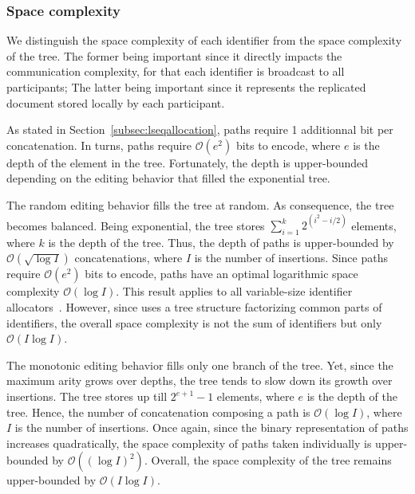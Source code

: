 
\subsubsection{Space complexity}

We distinguish the space complexity of each identifier from the space complexity
of the tree. The former being important since it directly impacts the
communication complexity, for that each identifier is broadcast to all
participants; The latter being important since it represents the replicated
document stored locally by each participant.

As stated in Section~\ref{subsec:lseqallocation}, paths require 1 additionnal
bit per concatenation. In turns, paths require $\mathcal{O}(e^2)$ bits to
encode, where $e$ is the depth of the element in the tree. Fortunately, the
depth is upper-bounded depending on the editing behavior that filled the
exponential tree.

The random editing behavior fills the tree at random. As consequence, the tree
becomes balanced. Being exponential, the tree stores
$\textstyle\sum\nolimits_{i=1}^{k}{2^{(i^2-i/2)}}$ elements, where $k$ is the
depth of the tree. Thus, the depth of paths is upper-bounded by
$\mathcal{O}(\sqrt{\log I})$ concatenations, where $I$ is the number of
insertions. Since paths require $\mathcal{O}(e^2)$ bits to encode, paths have an
optimal logarithmic space complexity $\mathcal{O}(\log I)$. This result applies
to all variable-size identifier allocators~\cite{preguica2009commutative,
  weiss2009logoot}. However, since \LSEQ uses a tree structure factorizing
common parts of identifiers, the overall space complexity is not the sum of
identifiers but only $\mathcal{O}(I\log I)$.

The monotonic editing behavior fills only one branch of the tree. Yet, since the
maximum arity grows over depths, the tree tends to slow down its growth over
insertions. The tree stores up till $2^{e+1}-1$ elements, where $e$ is the depth
of the tree. Hence, the number of concatenation composing a path is
$\mathcal{O}(\log I)$, where $I$ is the number of insertions. Once again, since
the binary representation of paths increases quadratically, the space complexity
of paths taken individually is upper-bounded by $\mathcal{O}((\log I)^2)$.
Overall, the space complexity of the tree remains upper-bounded by
$\mathcal{O}(I\log I)$.

